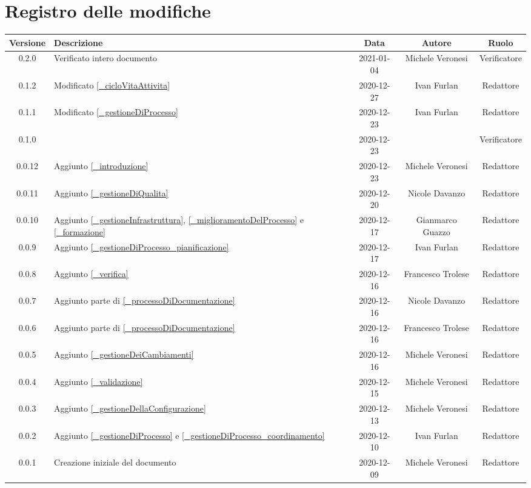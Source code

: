 \section*{Registro delle modifiche}

\begin{center}
	\begin{longtable}{|c|p{5cm}|c|c|c|}
		\hline
		\rowcolor{lighter-grayer}
		\textbf{Versione} & \textbf{Descrizione} & \textbf{Data} & \textbf{Autore} & \textbf{Ruolo} \\
		\hline
		\endfirsthead


		0.2.0 & Verificato intero documento & 2021-01-04 & Michele Veronesi & Verificatore \\
		0.1.2 & Modificato \ref{_cicloVitaAttivita} & 2020-12-27& Ivan Furlan & Redattore \\
		0.1.1 & Modificato \ref{_gestioneDiProcesso} & 2020-12-23 & Ivan Furlan & Redattore \\
		0.1.0 &  & 2020-12-23 &  & Verificatore \\
		0.0.12 & Aggiunto \ref{_introduzione} & 2020-12-23 & Michele Veronesi & Redattore \\
		0.0.11 & Aggiunto \ref{_gestioneDiQualita} & 2020-12-20 & Nicole Davanzo & Redattore \\
		0.0.10 & Aggiunto \ref{_gestioneInfrastruttura}, \ref{_miglioramentoDelProcesso} e \ref{_formazione} & 2020-12-17 & Gianmarco Guazzo & Redattore \\
		0.0.9 & Aggiunto \ref{_gestioneDiProcesso_pianificazione} & 2020-12-17 & Ivan Furlan & Redattore \\
		0.0.8 & Aggiunto \ref{_verifica} & 2020-12-16 & Francesco Trolese & Redattore \\
		0.0.7 & Aggiunto parte di \ref{_processoDiDocumentazione} & 2020-12-16 & Nicole Davanzo & Redattore \\
		0.0.6 & Aggiunto parte di \ref{_processoDiDocumentazione} & 2020-12-16 & Francesco Trolese & Redattore \\
		0.0.5 & Aggiunto \ref{_gestioneDeiCambiamenti} & 2020-12-16 & Michele Veronesi & Redattore \\
		0.0.4 & Aggiunto \ref{_validazione} & 2020-12-15 & Michele Veronesi & Redattore \\
		0.0.3 & Aggiunto \ref{_gestioneDellaConfigurazione} & 2020-12-13 & Michele Veronesi & Redattore \\
		0.0.2 & Aggiunto \ref{_gestioneDiProcesso} e \ref{_gestioneDiProcesso_coordinamento} & 2020-12-10 & Ivan Furlan & Redattore \\
		0.0.1 & Creazione iniziale del documento & 2020-12-09 & Michele Veronesi & Redattore \\
		
		\hline
	\end{longtable}
\end{center}